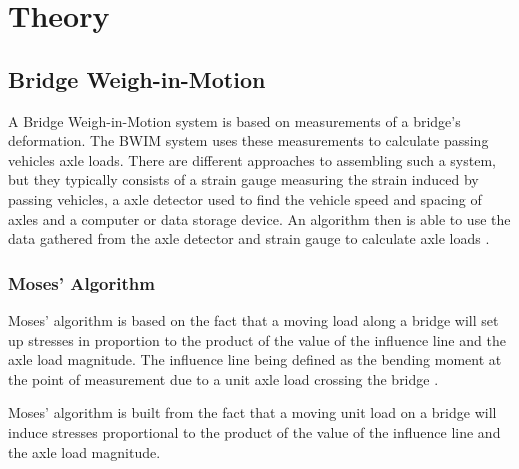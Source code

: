 \chapter{Theory}

\section{Bridge Weigh-in-Motion}
A Bridge Weigh-in-Motion system is based on measurements of a bridge's deformation. The BWIM system uses these measurements to calculate passing vehicles axle loads.
There are different approaches to assembling such a system, but they typically consists of a strain gauge measuring the strain induced by passing vehicles, a axle detector used to find the vehicle speed and spacing of axles and a computer or data storage device. An algorithm then is able to use the data gathered from the axle detector and strain gauge to calculate axle loads \cite{Quilligan}.
\subsection{Moses' Algorithm}
Moses' algorithm is based on the fact that a moving load along a bridge will set up stresses in proportion to the product of the value of the influence line and the axle load magnitude. The influence line being defined as the bending moment at the point of measurement due to a unit axle load crossing the bridge \cite{Quilligan}.

Moses' algorithm is built from the fact that a moving unit load on a bridge will induce stresses proportional to the product of the value of the influence line and the axle load magnitude.

